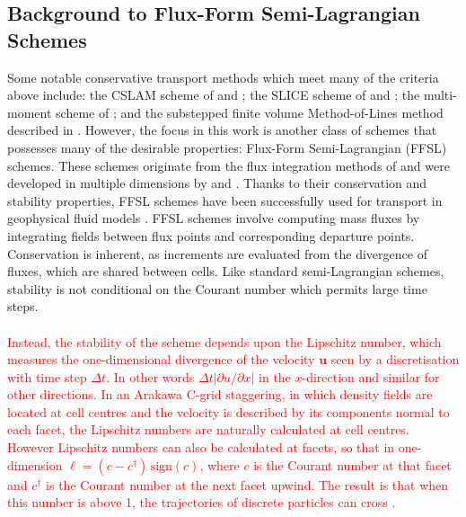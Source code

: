 \documentclass{ametsocV6.1}
\newcommand{\change}[1]{\textcolor{red}{#1}}
\begin{document}
\subsection{Background to Flux-Form Semi-Lagrangian Schemes}
Some notable conservative transport methods which meet many of the criteria above include: the CSLAM scheme of \citet{lauritzen2010conservative} and \citet{harris2011flux}; the SLICE scheme of \citet{zerroukat2002slice,zerroukat2004slice} and \citet{zerroukat2012three}; the multi-moment scheme of \cite{tang2022three}; and the substepped finite volume Method-of-Lines method described in \citet{melvin2024mixed}.
However, the focus in this work is another class of schemes that possesses many of the desirable properties: Flux-Form Semi-Lagrangian (FFSL) schemes.
These schemes originate from the flux integration methods of \citet{van1974towards,colella1984ppm,carpenter1990application}
and were developed in multiple dimensions by \citet{leonard1996cosmic} and \citet{lin1996ffsl}.
Thanks to their conservation and stability properties, FFSL schemes have been successfully used for transport in geophysical fluid models \citep{lin2004fvcore,putman2007fvtransport,zhou2012computational,neale2013mean,gillibrand2016mass,harris2021scientific,zhang2023history,mouallem2023implementation}.
FFSL schemes involve computing mass fluxes by integrating fields between flux points and corresponding departure points.
Conservation is inherent, as increments are evaluated from the divergence of fluxes, which are shared between cells.
Like standard semi-Lagrangian schemes, stability is not conditional on the Courant number which permits large time steps. \\
\\
\change{Instead, the stability of the scheme depends upon the Lipschitz number, which measures the one-dimensional divergence of the velocity $\bm{u}$ seen by a discretisation with time step $\Delta t$.
In other words $\Delta t|\partial u /\partial x|$ in the $x$-direction and similar for other directions.
In an Arakawa C-grid staggering, in which density fields are located at cell centres and the velocity is described by its components normal to each facet, the Lipschitz numbers are naturally calculated at cell centres.
However Lipschitz numbers can also be calculated at facets, so that in one-dimension $\ell=(c-c^\dagger) \, \mathrm{sign}(c)$, where $c$ is the Courant number at that facet and $c^\dagger$ is the Courant number at the next facet upwind.
The result is that when this number is above 1, the trajectories of discrete particles can cross \citep{smolarkiewicz1992class}.}\\
\end{document}
